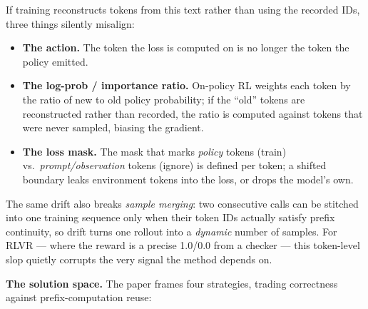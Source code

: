 \documentclass[
  paper=a4,
  ,captions=tableheading
]{scrartcl}
\providecommand{\tightlist}{%
  \setlength{\itemsep}{0pt}\setlength{\parskip}{0pt}}
\begin{document}
If training reconstructs tokens from this text rather than using the
recorded IDs, three things silently misalign:

\begin{itemize}
\tightlist
\item
  \textbf{The action.} The token the loss is computed on is no longer
  the token the policy emitted.
\item
  \textbf{The log-prob / importance ratio.} On-policy RL weights each
  token by the ratio of new to old policy probability; if the ``old''
  tokens are reconstructed rather than recorded, the ratio is computed
  against tokens that were never sampled, biasing the gradient.
\item
  \textbf{The loss mask.} The mask that marks \emph{policy} tokens
  (train) vs.~\emph{prompt/observation} tokens (ignore) is defined per
  token; a shifted boundary leaks environment tokens into the loss, or
  drops the model's own.
\end{itemize}

The same drift also breaks \emph{sample merging}: two consecutive calls
can be stitched into one training sequence only when their token IDs
actually satisfy prefix continuity, so drift turns one rollout into a
\emph{dynamic} number of samples. For RLVR --- where the reward is a
precise 1.0/0.0 from a checker --- this token-level slop quietly
corrupts the very signal the method depends on.

\textbf{The solution space.} The paper frames four strategies, trading
correctness against prefix-computation reuse:
\end{document}
